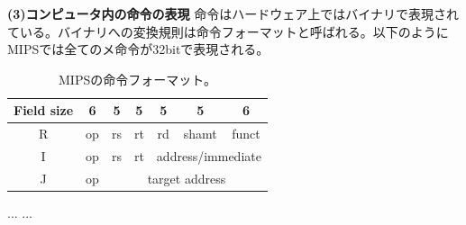 \documentclass[a4j,10pt,oneside,openany,fleqn]{jsbook}
\begin{document}
\textbf{(3)コンピュータ内の命令の表現}
命令はハードウェア上ではバイナリで表現されている。バイナリへの変換規則は命令フォーマットと呼ばれる。以下のようにMIPSでは全てのメ命令が32bitで表現される。
\begin{table}[htb]
  \begin{center}
    \begin{tabular}{|c|c|c|c|c|c|c|} \hline
      Field size & 6 & 5 & 5 & 5 & 5 & 6\\ \hline 
      R & op & rs & rt & rd & shamt & funct \\ \hline
      I & op & rs & rt & \multicolumn{3}{c|}{address/immediate} \\ \hline
      J & op & \multicolumn{5}{c|}{target address} \\ \hline
    \end{tabular}
  \end{center}
  \caption{MIPSの命令フォーマット。}
\end{table}


\begin{thebibliography}{20}
...
  ...
\end{thebibliography}

\newpage
\printindex
%
%
\end{document}
